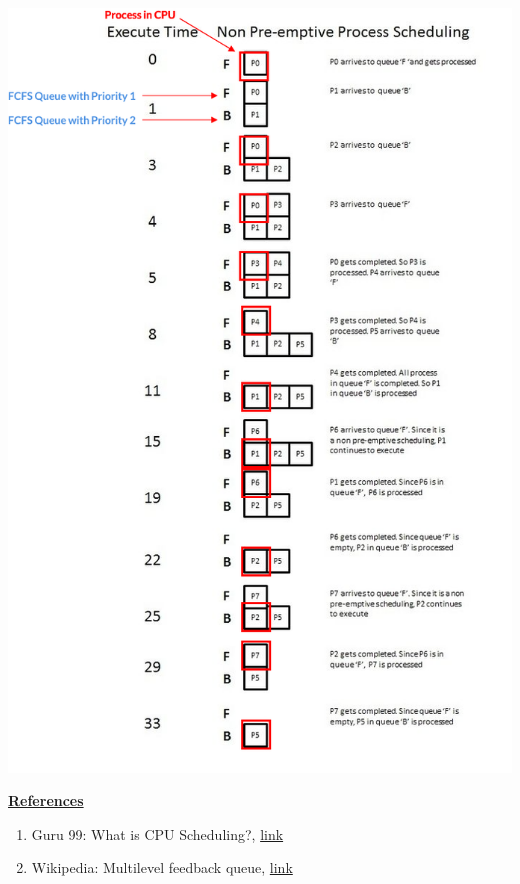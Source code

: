 \documentclass[12pt]{article}
\begin{document}
\begin{itemize}
    \begin{center}
    \includegraphics[width=0.8\linewidth]{../images/week_4_notes_1_5.png}
    \end{center}

    \bigskip

    \underline{\textbf{References}}

    \begin{enumerate}[1)]
        \item Guru 99: What is CPU Scheduling?, \href{https://www.guru99.com/cpu-scheduling-algorithms.html#8}{link}
        \item Wikipedia: Multilevel feedback queue, \href{https://en.wikipedia.org/wiki/Multilevel_feedback_queue}{link}
    \end{enumerate}


\end{itemize}
\end{document}
